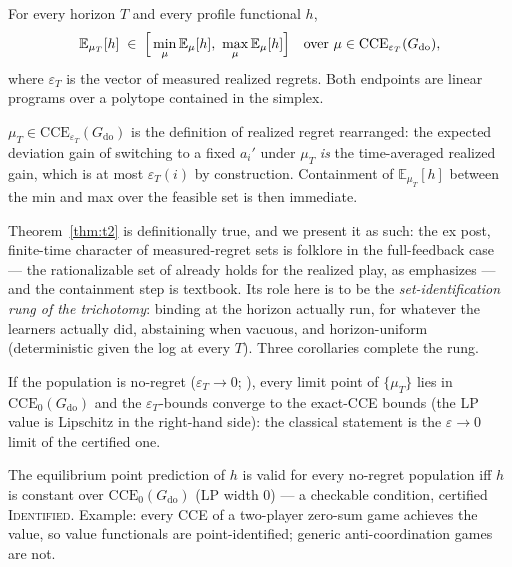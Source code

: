 \documentclass[pmlr]{jmlr}
\renewenvironment{proof}[1][\proofname]%
  {\par\noindent{\bfseries\upshape #1.\ }}{\jmlrQED}
\newcommand{\E}{\mathbb{E}}
\newcommand{\doop}{\mathrm{do}}
\newcommand{\CCE}{\mathrm{CCE}}
\newcommand{\Cid}{\textsc{Identified}}
\begin{document}
\begin{theorem}\label{thm:t2}
For every horizon $T$ and every profile functional $h$,
\[
\E_{\mu_T}[h] \;\in\; \Bigl[\, \min_{\mu} \E_\mu[h],\ \max_{\mu} \E_\mu[h]
\Bigr] \quad \text{over } \mu \in \CCE_{\varepsilon_T}(G_{\doop}),
\]
where $\varepsilon_T$ is the vector of measured realized regrets. Both endpoints are linear
programs over a polytope contained in the simplex.
\end{theorem}
\begin{proof}
$\mu_T \in \CCE_{\varepsilon_T}(G_{\doop})$ is the definition of realized regret rearranged: the
expected deviation gain of switching to a fixed $a_i'$ under $\mu_T$ \emph{is} the time-averaged
realized gain, which is at most $\varepsilon_T(i)$ by construction. Containment of
$\E_{\mu_T}[h]$ between the min and max over the feasible set is then immediate.
\end{proof}

Theorem~\ref{thm:t2} is definitionally true, and we present it as such: the ex post, finite-time
character of measured-regret sets is folklore in the full-feedback case --- the rationalizable
set of \citet{nekipelov2015econometrics} already holds for the realized play, as
\citet{hartline2026economics} emphasizes --- and the containment step is textbook. Its role here
is to be the \emph{set-identification rung of the trichotomy}: binding at the horizon actually
run, for whatever the learners actually did, abstaining when vacuous, and horizon-uniform
(deterministic given the log at every $T$). Three corollaries complete the rung.

\begin{corollary}\label{cor:asymptotic}
If the population is no-regret ($\varepsilon_T \to 0$;
\citealp{foster1997calibrated,hart2000simple}), every limit point of $\{\mu_T\}$ lies in
$\CCE_0(G_{\doop})$ and the $\varepsilon_T$-bounds converge to the exact-CCE bounds (the LP
value is Lipschitz in the right-hand side): the classical statement is the $\varepsilon \to 0$
limit of the certified one.
\end{corollary}

\begin{corollary}\label{cor:degeneracy}
The equilibrium point prediction of $h$ is valid for every no-regret population iff
$h$ is constant over $\CCE_0(G_{\doop})$ (LP width $0$) --- a checkable condition, certified
\Cid. Example: every CCE of a two-player zero-sum game achieves the value, so value functionals
are point-identified; generic anti-coordination games are not.
\end{corollary}
\end{document}
